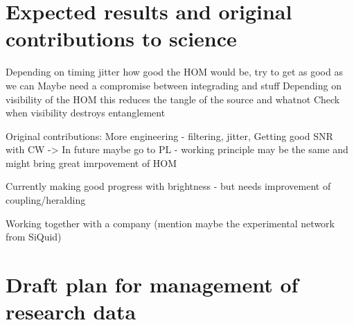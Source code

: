 \documentclass{article}
\theoremstyle{mytheoremstyle}
\theoremstyle{mytheoremstyle}
\theoremstyle{myproblemstyle}
\begin{document}
\section{Expected results and original contributions to science}
Depending on timing jitter how good the HOM would be, try to get as good as we can
Maybe need a compromise between integrading and stuff
Depending on visibility of the HOM this reduces the tangle of the source and whatnot
Check when visibility destroys entanglement

Original contributions: More engineering - filtering, jitter,
Getting good SNR with CW -> In future maybe go to PL - working principle may be the same and might bring great imrpovement of HOM

Currently making good progress with brightness - but needs improvement of coupling/heralding

Working together with a company (mention maybe the experimental network from SiQuid)

\section{Draft plan for management of research data}

\newpage


\end{document}
